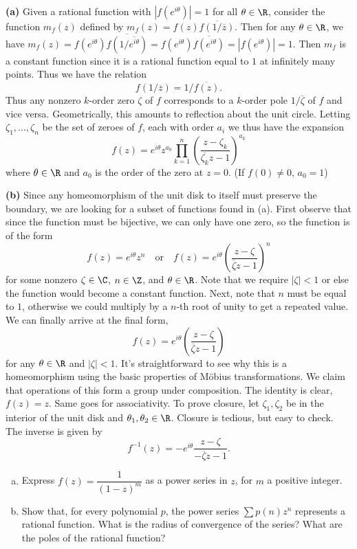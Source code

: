 \documentclass[11pt,letterpaper]{article}
\begin{document}
\begin{solution}
    \textbf{(a)} Given a rational function with $|f(e^{i\theta})|=1$ for all $\theta\in \R$, consider the function $m_f(z)$ defined by $m_f(z)=f(z)\overline{f(1 /\overline{z})}$. Then for any $\theta\in\R$, we have $m_f(z)=f(e^{i\theta})\overline{f(1 /\overline{e^{i\theta}})} = f(e^{i\theta})\overline{f(e^{i\theta})}=|f(e^{i\theta})|=1$. Then $m_f$ is a constant function since it is a rational function equal to $1$ at infinitely many points. Thus we have the relation
    \[
        f(1/\overline{z}) = 1/\overline{f(z)}
    .\]    
    Thus any nonzero $k$-order zero $\zeta$ of $f$ corresponds to a $k$-order pole ${1}/{\overline{\zeta}}$ of $f$ and vice versa. Geometrically, this amounts to reflection about the unit circle. Letting $\zeta_1,\ldots,\zeta_n$ be the set of zeroes of $f$, each with order $a_i$ we thus have the expansion
    \[
        f(z)=e^{i\theta} z^{a_0}\prod^n_{k=1}\left(\frac{z-\zeta_k}{\overline{\zeta_k}z-1}\right)^{a_k}
    \]
    where $\theta\in \R$ and $a_0$ is the order of the zero at $z=0$. (If $f(0)\neq 0$, $a_0=1$)
    
    \textbf{(b)} Since any homeomorphism of the unit disk to itself must preserve the boundary, we are looking for a subset of functions found in (a). First observe that since the function must be bijective, we can only have one zero, so the function is of the form
    \[
        f(z)=e^{i\theta} z^{n}\quad\mathrm{or}\quad f(z)=e^{i\theta} \left(\frac{z-\zeta}{\overline{\zeta}z-1}\right)^n
    \]
    for some nonzero $\zeta\in \C$, $n\in \Z$, and $\theta\in \R$. Note that we require $|\zeta| < 1$ or else the function would become a constant function. Next, note that $n$ must be equal to $1$, otherwise we could multiply by a $n$-th root of unity to get a repeated value. We can finally arrive at the final form,
    \[
        f(z)=e^{i\theta}\left(\frac{z-\zeta}{\overline{\zeta}z-1}\right)
    \]
    for any $\theta\in \R$ and $|\zeta|<1$. It's straightforward to see why this is a homeomorphism using the basic properties of M\"obius transformations. We claim that operations of this form a group under composition. The identity is clear, $f(z)=z$. Same goes for associativity. To prove closure, let $\zeta_1,\zeta_2$ be in the interior of the unit disk and $\theta_1,\theta_2\in \R$. Closure is tedious, but easy to check. The inverse is given by
    \[
        f^{-1}(z)=-e^{i\theta}\frac{z-\zeta}{-\overline{\zeta}z-1}
    .\] 
\end{solution}

\begin{problem}\noindent
    \begin{enumerate}[(a)]
        \item Express $f(z)=\dfrac{1}{(1-z)^m}$ as a power series in $z$, for $m$ a positive integer. 
        \item Show that, for every polynomial $p$, the power series $\sum p(n)z^n$ represents a rational function. What is the radius of convergence of the series? What are the poles of the rational function? 
    \end{enumerate}
\end{problem}
\end{document}
